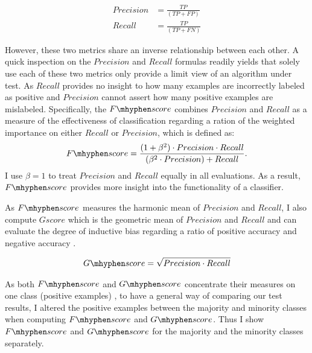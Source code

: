 \documentclass{iitthesis}
\newcommand\fscore{\mathop{F\mhyphen score}}
\newcommand\gscore{\mathop{G\mhyphen score}}
\begin{document}
\begin{align*}
Precision &= \frac{TP}{(TP + FP)}\\
Recall &= \frac{TP}{(TP+FN)}  
\end{align*}

However, these two metrics share an inverse relationship between each other. A quick inspection on the $Precision$ and $Recall$ formulas readily yields that solely use each of these two metrics only provide a limit view of an algorithm under test. As $Recall$ provides no insight to how many examples are incorrectly labeled as positive and $Precision$ cannot assert how many positive examples are mislabeled. Specifically, the $\fscore$ combines $Precision$ and $Recall$ as a measure of the effectiveness of classification regarding a ration of the weighted importance on either $Recall$ or $Precision$, which is defined as:
\begin{align*}
\fscore = \frac{(1+\beta^2)\cdot Precision \cdot Recall}{(\beta^2\cdot Precision)+ Recall}.
\end{align*}
I use $\beta=1$ to treat $Precision$ and $Recall$ equally in all evaluations. As a result, $\fscore$ provides more insight into the functionality of a classifier.

As $\fscore$ measures the harmonic mean of $Precision$ and $Recall$, I also compute $Gscore$ which is the geometric mean of $Precision$ and $Recall$ and can evaluate the degree of inductive bias regarding a ratio of positive accuracy and negative accuracy \cite{HH:09}.

\begin{align*}
\gscore=\sqrt{Precision \cdot Recall}
\end{align*}

As both $\fscore$ and $\gscore$ concentrate their measures on one class (positive examples) \cite{sokolova2006beyond}, to have a general way of comparing our test results, I altered the positive examples between the majority and minority classes when computing $\fscore$ and $\gscore$. Thus I show $\fscore$ and $\gscore$ for the majority and the minority classes separately.
\end{document}
